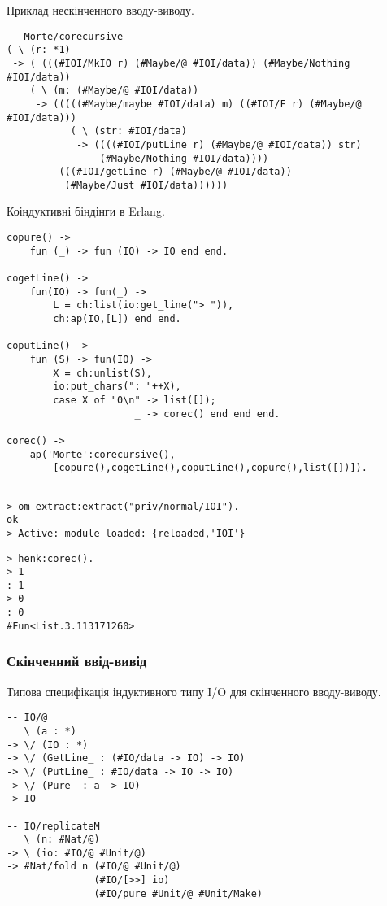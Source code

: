 \documentclass{article}
\begin{document}
Приклад нескінченного вводу-виводу.

\begin{lstlisting}[mathescape=true]
-- Morte/corecursive
( \ (r: *1)
 -> ( (((#IOI/MkIO r) (#Maybe/@ #IOI/data)) (#Maybe/Nothing #IOI/data))
    ( \ (m: (#Maybe/@ #IOI/data))
     -> (((((#Maybe/maybe #IOI/data) m) ((#IOI/F r) (#Maybe/@ #IOI/data)))
           ( \ (str: #IOI/data)
            -> ((((#IOI/putLine r) (#Maybe/@ #IOI/data)) str)
                (#Maybe/Nothing #IOI/data))))
         (((#IOI/getLine r) (#Maybe/@ #IOI/data))
          (#Maybe/Just #IOI/data))))))
\end{lstlisting}

Коіндуктивні біндінги в Erlang.

\begin{lstlisting}[mathescape=true]
copure() ->
    fun (_) -> fun (IO) -> IO end end.

cogetLine() ->
    fun(IO) -> fun(_) ->
        L = ch:list(io:get_line("> ")),
        ch:ap(IO,[L]) end end.

coputLine() ->
    fun (S) -> fun(IO) ->
        X = ch:unlist(S),
        io:put_chars(": "++X),
        case X of "0\n" -> list([]);
                      _ -> corec() end end end.

corec() ->
    ap('Morte':corecursive(),
        [copure(),cogetLine(),coputLine(),copure(),list([])]).
\end{lstlisting}

\begin{lstlisting}[mathescape=true]

> om_extract:extract("priv/normal/IOI").
ok
> Active: module loaded: {reloaded,'IOI'}
\end{lstlisting}

\begin{lstlisting}[mathescape=true]
> henk:corec().
> 1
: 1
> 0
: 0
#Fun<List.3.113171260>
\end{lstlisting}

\subsubsection{Скінченний ввід-вивід}

Типова специфікація індуктивного типу I/O для скінченного вводу-виводу.

\begin{lstlisting}[mathescape=true]
-- IO/@
   \ (a : *)
-> \/ (IO : *)
-> \/ (GetLine_ : (#IO/data -> IO) -> IO)
-> \/ (PutLine_ : #IO/data -> IO -> IO)
-> \/ (Pure_ : a -> IO)
-> IO

-- IO/replicateM
   \ (n: #Nat/@)
-> \ (io: #IO/@ #Unit/@)
-> #Nat/fold n (#IO/@ #Unit/@)
               (#IO/[>>] io)
               (#IO/pure #Unit/@ #Unit/Make)
\end{lstlisting}
\end{document}
